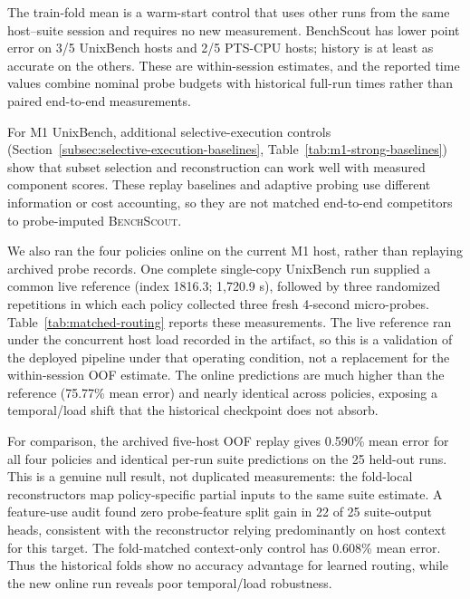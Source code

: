\documentclass[sigconf, review, anonymous, balance=false]{acmart}
\newcommand{\ourmethod}{\textsc{BenchScout}\xspace}
\begin{document}
The train-fold mean is a warm-start control that uses other runs from the same host--suite session and requires no new measurement. BenchScout has lower point error on 3/5 UnixBench hosts and 2/5 PTS-CPU hosts; history is at least as accurate on the others. These are within-session estimates, and the reported time values combine nominal probe budgets with historical full-run times rather than paired end-to-end measurements.

For M1 UnixBench, additional selective-execution controls (Section~\ref{subsec:selective-execution-baselines}, Table~\ref{tab:m1-strong-baselines}) show that subset selection and reconstruction can work well with measured component scores. These replay baselines and adaptive probing use different information or cost accounting, so they are not matched end-to-end competitors to probe-imputed \ourmethod{}.

We also ran the four policies online on the current M1 host, rather than replaying archived probe records. One complete single-copy UnixBench run supplied a common live reference (index 1816.3; 1,720.9 s), followed by three randomized repetitions in which each policy collected three fresh 4-second micro-probes. Table~\ref{tab:matched-routing} reports these measurements. The live reference ran under the concurrent host load recorded in the artifact, so this is a validation of the deployed pipeline under that operating condition, not a replacement for the within-session OOF estimate. The online predictions are much higher than the reference (75.77\% mean error) and nearly identical across policies, exposing a temporal/load shift that the historical checkpoint does not absorb.

For comparison, the archived five-host OOF replay gives 0.590\% mean error for all four policies and identical per-run suite predictions on the 25 held-out runs. This is a genuine null result, not duplicated measurements: the fold-local reconstructors map policy-specific partial inputs to the same suite estimate. A feature-use audit found zero probe-feature split gain in 22 of 25 suite-output heads, consistent with the reconstructor relying predominantly on host context for this target. The fold-matched context-only control has 0.608\% mean error. Thus the historical folds show no accuracy advantage for learned routing, while the new online run reveals poor temporal/load robustness.
\end{document}
